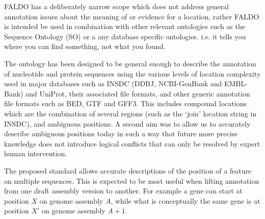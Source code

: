 FALDO has a deliberately narrow scope which does not address general annotation
issues about the meaning of or evidence for a location, rather FALDO is intended be
used in combination with other relevant ontologies such as the Sequence Ontology
(SO) \cite{SequenceOntology2005} or a any database specific ontologies. 
i.e. it tells you where you can find something, not what you found.

The ontology has been designed to be general enough to describe the annotation
of nucleotide and protein sequences using the various levels of location complexity used
in major databases such as INSDC (DDBJ, NCBI-GenBank and EMBL-Bank) and UniProt, their
associated file formats, and other generic annotation file formats such as BED,
GTF and GFF3. This includes compound locations which are the combination of
several regions (such as the `join' location string in INSDC), and ambiguous
positions. A second aim was to allow us to accurately describe ambiguous positions today
in such a way that future more precise knowledge does not introduce logical conflicts 
that can only be resolved by expert human intervention.

The proposed standard allows accurate descriptions of the position of a feature on multiple sequences.
This is expected to be most useful when lifting annotation from one draft assembly version to another.
For example a gene can start at position $X$ on genome assembly $A$,
while what is conceptually the same gene is at position $X'$ on genome assembly $A+1$.
